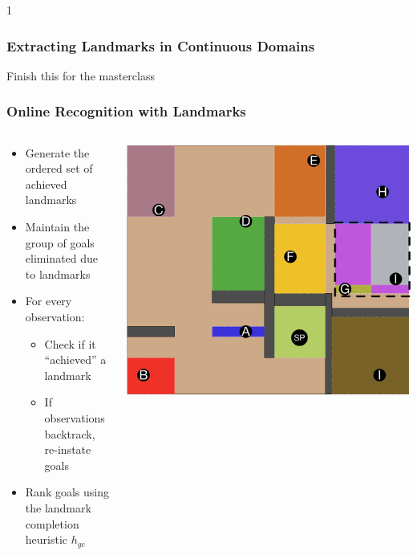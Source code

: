 \documentclass{beamer}
\newcommand{\todo}[1]{ {\color{red} #1} }
\def\masterclass{1}
\begin{document}
	\if\masterclass1
	\begin{frame}[c]\frametitle{Extracting Landmarks in Continuous Domains}
		\todo{Finish this for the masterclass}
	\end{frame}
	\fi

	\begin{frame}[c]\frametitle{Online Recognition with Landmarks}
		\begin{columns}
			\begin{column}{0.7\textwidth}
			\begin{itemize}
				\item Generate the ordered set of achieved landmarks
				\item Maintain the group of goals eliminated due to landmarks
				\item For every observation:
				\begin{itemize}
					\item Check if it ``achieved'' a landmark
					\item If observations backtrack, re-instate goals
				\end{itemize}
				\item Rank goals using the landmark completion heuristic $h_{gc}$
			\end{itemize}
			\end{column}
			\begin{column}{0.3\textwidth}
				\includegraphics[width=\textwidth]{fig/continuous-landmark-example.pdf}
			\end{column}
		\end{columns}
	\end{frame}
	
\end{document}
